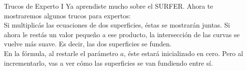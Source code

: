 \begin{surferPage}{Trucos de Experto I}
Ya aprendiste mucho sobre el SURFER. Ahora te mostraremos algunos trucos para expertos:\\
\vspace{0.3cm}
Si multiplic{\'a}s las ecuaciones de dos superficies, {\'e}stas se mostrar{\'a}n juntas. Si ahora le rest{\'a}s un valor peque{\~n}o a ese producto, la intersecci{\'o}n de las curvas se vuelve m{\'a}s suave. Es decir, las dos superficies se funden.\\
\vspace{0.3cm}
En la f{\'o}rmula, al restarle el par{\'a}metro $a$, {\'e}ste estar{\'a} inicializado en cero. Pero al incrementarlo, vas a ver c{\'o}mo las superficies se van fundiendo entre s{\'i}.
\end{surferPage}
